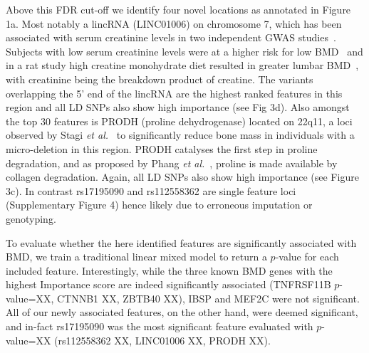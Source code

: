 \documentclass[10pt,letterpaper]{article}
\begin{document}
Above this FDR cut-off we identify four novel locations as annotated in Figure 1a.
Most notably a lincRNA (LINC01006) on chromosome 7, which has been associated with serum creatinine levels in two independent GWAS studies~\cite{Pattaro2010,Chambers2010}. 
Subjects with low serum creatinine levels were at a higher risk for low BMD~\cite{Huh2015} and in a rat study high creatine monohydrate diet resulted in greater lumbar BMD~\cite{Antolic2007}, 
with creatinine being the breakdown product of creatine. The variants overlapping the 5' end of the lincRNA are the highest ranked features in this region and all LD SNPs also show high importance (see Fig 3d). Also amongst the top 30 features is PRODH (proline dehydrogenase) located on 22q11, a loci observed by Stagi {\it
  et al.}~\cite{Stagi.2010} to significantly reduce bone mass in individuals with a micro-deletion in this region. 
PRODH catalyses the first step in proline degradation, and as proposed by Phang {\it et al.}~\cite{Phang.2008}, proline is made available by collagen degradation. 
Again, all LD SNPs also show high importance (see Figure 3c). %
In contrast rs17195090 and rs112558362 are single feature loci (Supplementary Figure 4) hence likely due to erroneous imputation or genotyping.

To evaluate whether the here identified features are significantly associated with BMD, we train a traditional linear mixed model to return a $p$-value for each included feature. Interestingly, while the three known BMD genes with the highest Importance score are indeed significantly associated (TNFRSF11B $p$-value=XX, CTNNB1 XX, ZBTB40 XX), IBSP and MEF2C were not significant. All of our newly associated features, on the other hand, were deemed significant, and in-fact rs17195090 was the most significant feature evaluated with $p$-value=XX (rs112558362 XX, LINC01006 XX, PRODH XX). 

\end{document}

